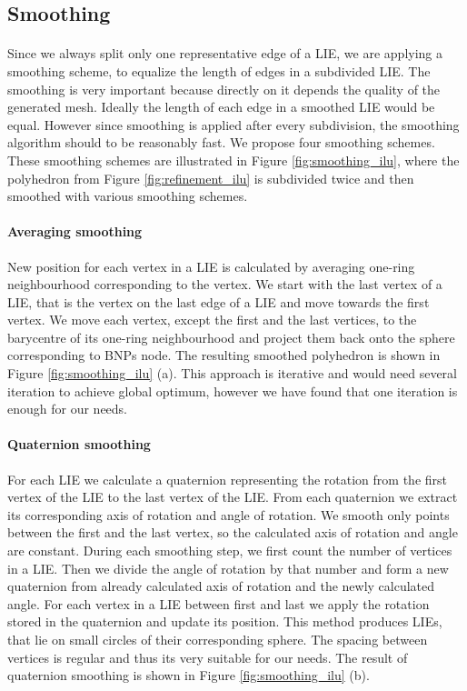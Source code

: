 \subsection{Smoothing}
\paragraph{}
Since we always split only one representative edge of a LIE, we are applying a smoothing scheme, to equalize the length of edges in a subdivided LIE. The smoothing is very important because directly on it depends the quality of the generated mesh. Ideally the length of each edge in a smoothed LIE would be equal. However since smoothing is applied after every subdivision, the smoothing algorithm should to be reasonably fast. We propose four smoothing schemes. These smoothing schemes are illustrated in Figure \ref{fig:smoothing_ilu}, where the polyhedron from Figure \ref{fig:refinement_ilu} is subdivided twice and then smoothed with various smoothing schemes.

\paragraph{Averaging smoothing}
New position for each vertex in a LIE is calculated by averaging one-ring neighbourhood corresponding to the vertex. We start with the last vertex of a LIE, that is the vertex on the last edge of a LIE and move towards the first vertex. We move each vertex, except the first and the last vertices, to the barycentre of its one-ring neighbourhood and project them back onto the sphere corresponding to BNPs node. The resulting smoothed polyhedron is shown in Figure \ref{fig:smoothing_ilu} (a). This approach is iterative and would need several iteration to achieve global optimum, however we have found that one iteration is enough for our needs.

\paragraph{Quaternion smoothing}
For each LIE we calculate a quaternion representing the rotation from the first vertex of the LIE to the last vertex of the LIE. From each quaternion we extract its corresponding axis of rotation and angle of rotation. We smooth only points between the first and the last vertex, so the calculated axis of rotation and angle are constant. During each smoothing step, we first count the number of vertices in a LIE. Then we divide the angle of rotation by that number and form a new quaternion from already calculated axis of rotation and the newly calculated angle. For each vertex in a LIE between first and last we apply the rotation stored in the quaternion and update its position. This method produces LIEs, that lie on small circles of their corresponding sphere. The spacing between vertices is regular and thus its very suitable for our needs. The result of quaternion smoothing is shown in Figure \ref{fig:smoothing_ilu} (b).

